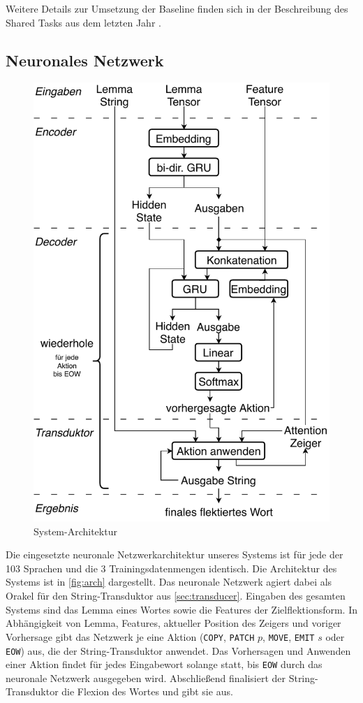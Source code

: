 \documentclass[a4paper]{article}
\newcommand{\action}[1]{\texttt{#1}}
\begin{document}
Weitere Details zur Umsetzung der Baseline finden sich in der Beschreibung des Shared Tasks aus dem letzten Jahr \cite{sigmorphon:st2017}.

\subsection{Neuronales Netzwerk}
\begin{figure}
\includegraphics[width=\linewidth]{architecture_de}
\caption{System-Architektur}
\label{fig:arch}
\end{figure}
Die eingesetzte neuronale Netzwerkarchitektur unseres Systems ist für jede der 103 Sprachen und die 3 Trainingsdatenmengen identisch.
Die Architektur des Systems ist in \autoref{fig:arch} dargestellt. Das neuronale Netzwerk agiert dabei als Orakel für den String-Transduktor aus \autoref{sec:transducer}.
Eingaben des gesamten Systems sind das Lemma eines Wortes sowie die Features der Zielflektionsform.
In Abhängigkeit von Lemma, Features, aktueller Position des Zeigers und voriger Vorhersage gibt das Netzwerk je eine Aktion (\action{COPY}, \action{PATCH} $p$, \action{MOVE}, \action{EMIT} $s$ oder \action{EOW}) aus, die der String-Transduktor anwendet.
Das Vorhersagen und Anwenden einer Aktion findet für jedes Eingabewort solange statt, bis \action{EOW} durch das neuronale Netzwerk ausgegeben wird. Abschließend finalisiert der String-Transduktor die Flexion des Wortes und gibt sie aus.
\end{document}
